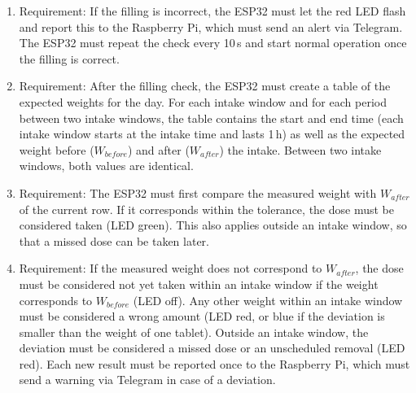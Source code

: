 \begin{enumerate}[label*=\arabic*.]
\begin{enumerate}[label*=\arabic*.]
			\item \label{req.2.10} Requirement: If the filling is incorrect, the ESP32 must let the red LED flash and report this to the Raspberry Pi, which must send an alert via Telegram. The ESP32 must repeat the check every 10\,s and start normal operation once the filling is correct.
			\item \label{req.2.11} Requirement: After the filling check, the ESP32 must create a table of the expected weights for the day. For each intake window and for each period between two intake windows, the table contains the start and end time (each intake window starts at the intake time and lasts 1\,h) as well as the expected weight before ($W_{before}$) and after ($W_{after}$) the intake. Between two intake windows, both values are identical.
			\item \label{req.2.12} Requirement: The ESP32 must first compare the measured weight with $W_{after}$ of the current row. If it corresponds within the tolerance, the dose must be considered taken (LED green). This also applies outside an intake window, so that a missed dose can be taken later.
			\item \label{req.2.13} Requirement: If the measured weight does not correspond to $W_{after}$, the dose must be considered not yet taken within an intake window if the weight corresponds to $W_{before}$ (LED off). Any other weight within an intake window must be considered a wrong amount (LED red, or blue if the deviation is smaller than the weight of one tablet). Outside an intake window, the deviation must be considered a missed dose or an unscheduled removal (LED red). Each new result must be reported once to the Raspberry Pi, which must send a warning via Telegram in case of a deviation.
		\end{enumerate}


\end{enumerate}
